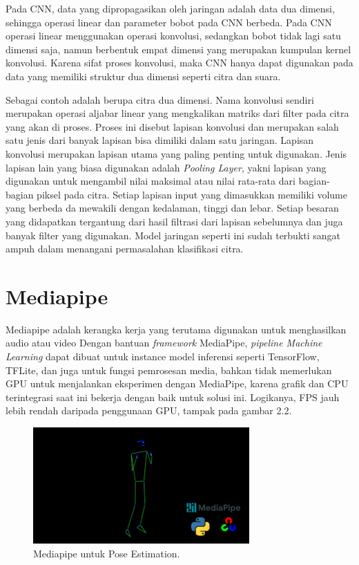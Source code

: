 Pada CNN, data yang dipropagasikan oleh jaringan adalah data dua dimensi, sehingga operasi linear dan parameter bobot pada CNN berbeda. Pada CNN operasi linear menggunakan operasi konvolusi, sedangkan bobot tidak lagi satu dimensi saja, namun berbentuk empat dimensi yang merupakan kumpulan kernel konvolusi. Karena sifat proses konvolusi, maka CNN hanya dapat digunakan pada data yang memiliki struktur dua dimensi seperti citra dan suara.

Sebagai contoh adalah berupa citra dua dimensi. Nama konvolusi sendiri merupakan operasi aljabar linear yang mengkalikan matriks dari filter pada citra yang akan di proses. Proses ini disebut lapisan konvolusi dan merupakan salah satu jenis dari banyak lapisan bisa dimiliki dalam satu jaringan. Lapisan konvolusi merupakan lapisan utama yang paling penting untuk digunakan. Jenis lapisan lain yang biasa digunakan adalah \emph{Pooling Layer}, yakni lapisan yang digunakan untuk mengambil nilai maksimal atau nilai rata-rata dari bagian-bagian piksel pada citra. Setiap lapisan input yang dimasukkan memiliki volume yang berbeda da mewakili dengan kedalaman, tinggi dan lebar. Setiap besaran yang didapatkan tergantung dari hasil filtrasi dari lapisan sebelumnya dan juga banyak filter yang digunakan. Model jaringan seperti ini sudah terbukti sangat ampuh dalam menangani permasalahan klasifikasi citra. 


\section{Mediapipe}
\label{sec:mediapipe}

Mediapipe adalah kerangka kerja yang terutama digunakan untuk menghasilkan audio atau video Dengan bantuan \emph{framework} MediaPipe, \emph{pipeline Machine Learning} dapat dibuat untuk instance model inferensi seperti TensorFlow, TFLite, dan juga untuk fungsi pemrosesan media, bahkan tidak memerlukan GPU untuk menjalankan eksperimen dengan MediaPipe, karena grafik dan CPU terintegrasi saat ini bekerja dengan baik untuk solusi ini. Logikanya, FPS jauh lebih rendah daripada penggunaan GPU, tampak pada gambar 2.2.

\begin{figure}[H]
  \centering

  \includegraphics[scale=1]{gambar/mediapipe.png}

  \caption{Mediapipe untuk Pose Estimation.}
  \label{fig:mediapipe}
\end{figure}
